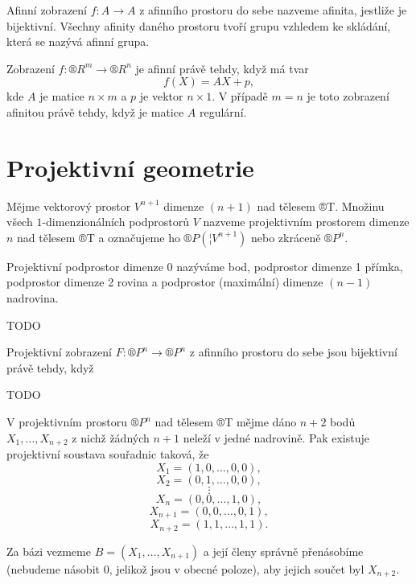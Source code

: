 \documentclass[12pt]{article}					%
\begin{document}
\begin{definice}[Afinita]
	Afinní zobrazení $f: A \rightarrow A$ z afinního prostoru do sebe nazveme afinita, jestliže je bijektivní. Všechny afinity daného prostoru tvoří grupu vzhledem ke skládání, která se nazývá afinní grupa.
\end{definice}

\begin{veta}
	Zobrazení $f: ®R^m \rightarrow ®R^n$ je afinní právě tehdy, když má tvar
	$$ f(X) = A X + p, $$
	kde $A$ je matice $n \times m$ a $p$ je vektor $n \times 1$. V případě $m = n$ je toto zobrazení afinitou právě tehdy, když je matice $A$ regulární.
\end{veta}

\section{Projektivní geometrie}
\begin{definice}
	Mějme vektorový prostor $V^{n+1}$ dimenze $(n+1)$ nad tělesem ®T. Množinu všech $1$-dimenzionálních podprostorů $V$ nazveme projektivním prostorem dimenze $n$ nad tělesem ®T a označujeme ho $®P(¦V^{n+1})$ nebo zkráceně $®P^n$.

	Projektivní podprostor dimenze 0 nazýváme bod, podprostor dimenze 1 přímka, podprostor dimenze 2 rovina a podprostor (maximální) dimenze $(n-1)$ nadrovina.
\end{definice}

TODO

\begin{veta}
	Projektivní zobrazení $F: ®P^n \rightarrow ®P^n$ z afinního prostoru do sebe jsou bijektivní právě tehdy, když
\end{veta}

TODO


\begin{veta}
	V projektivním prostoru $®P^n$ nad tělesem ®T mějme dáno $n+2$ bodů $X_1, …, X_{n+2}$ z nichž žádných $n+1$ neleží v jedné nadrovině. Pak existuje projektivní soustava souřadnic taková, že
	$$ X_1 = (1, 0, …, 0, 0), $$
	$$ X_2 = (0, 1, …, 0, 0), $$
	$$ \vdots $$
	$$ X_n = (0, 0, …, 1, 0), $$
	$$ X_{n+1} = (0, 0, …, 0, 1), $$
	$$ X_{n+2} = (1, 1, …, 1, 1). $$

	\begin{dukazin}
		Za bázi vezmeme $B = (X_1, …, X_{n+1})$ a její členy správně přenásobíme (nebudeme násobit 0, jelikož jsou v obecné poloze), aby jejich součet byl $X_{n+2}$.
	\end{dukazin}
\end{veta}
\end{document}
